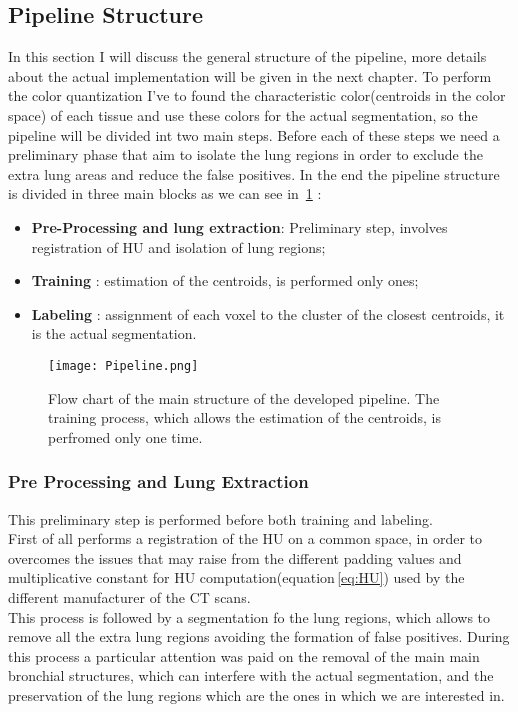 \documentclass{standalone}
\begin{document}
	\subsection{Pipeline Structure}
	
	In this section I will discuss the general structure of the pipeline, more details about the actual implementation will be given in the next chapter.
	To perform the color quantization I've to found the characteristic color(centroids in the color space) of each tissue and use these colors for the actual segmentation, so the pipeline will be divided int two main steps. Before each of these steps we need a preliminary phase that aim to isolate the lung regions in order to exclude the extra lung areas and reduce the false positives.
	In the end the pipeline structure is divided in three main blocks as we can see in \figurename\,\ref{fig:Pipeline} : 
	\begin{itemize}
		\item \textbf{Pre-Processing and lung extraction}: Preliminary step, involves registration of HU and isolation of lung regions;
		\item \textbf{Training} : estimation of the centroids, is performed only ones; 
		\item \textbf{Labeling} :  assignment of each voxel to the cluster of the closest centroids, it is the actual segmentation.
	\end{itemize}
	
		
	\begin{figure}[h!]
		\centering 
			\texttt{[image: Pipeline.png]}
		\label{fig:Pipeline}\caption{Flow chart of the main structure of the developed pipeline. The training process, which allows the estimation of the centroids, is perfromed only one time.}
	\end{figure} 
	
	\subsubsection*{Pre Processing and Lung Extraction}
	
	This preliminary step is performed before both training and labeling.\\
	First of all performs a registration of the HU on a common space, in order to overcomes the issues that may raise from the different padding values and multiplicative constant for HU computation(equation\,\ref{eq:HU}) used by the different manufacturer of the CT scans.\\
	This process is followed by a segmentation fo the lung regions, which allows to remove all the extra lung regions avoiding the formation of false positives. During this process a particular attention was paid on the removal of the main main bronchial structures, which can interfere with the actual segmentation, and the preservation of the lung regions which are the ones in which we are interested in.
	
\end{document}
